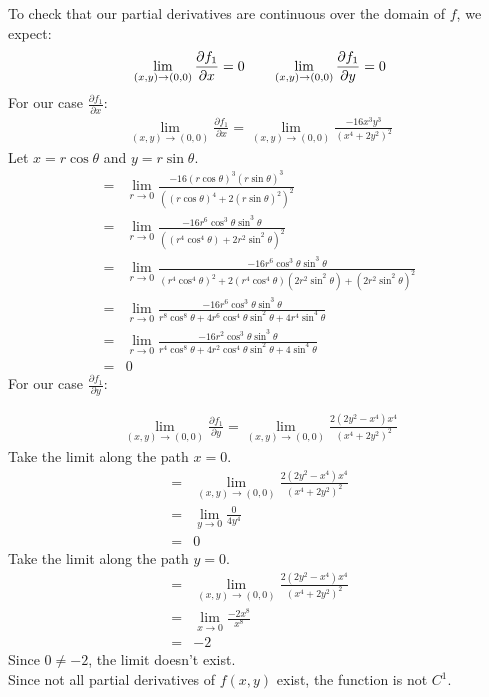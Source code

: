 \documentclass[12pt]{article}
\begin{document}
To check that our partial derivatives are continuous over the domain of $f$, we expect:
\[
	\lim_{(x,y) \rightarrow (0,0)}\frac{\partial f_1}{\partial x}=0 \hspace{20px} \lim_{(x,y) \rightarrow (0,0)}\frac{\partial f_1}{\partial y}=0
\]
\medskip
For our case $\frac{\partial f_1}{\partial x}$:
\begin{align}
	\lim_{(x,y) \rightarrow (0,0)}\frac{\partial f_1}{\partial x}=\lim_{(x,y) \rightarrow (0,0)}\frac{-16x^3y^3}{(x^4+2y^2)^2}
\end{align}
Let $x=r\cos \theta$ and $y=r\sin \theta$.
\begin{align*}
	=&\lim_{r \rightarrow 0}\frac{-16(r\cos \theta)^3(r\sin \theta)^3}{((r\cos \theta)^4+2(r\sin \theta)^2)^2}\\
	=&\lim_{r \rightarrow 0}\frac{-16r^6\cos^3 \theta \sin^3 \theta}{((r^4\cos^4 \theta)+2r^2\sin^2 \theta)^2} \\
	=&\lim_{r \rightarrow 0}\frac{-16r^6\cos^3 \theta \sin^3 \theta}{(r^4\cos^4 \theta)^2+2(r^4\cos^4 \theta)(2r^2\sin^2 \theta)+(2r^2\sin^2 \theta)^2} \\
	=&\lim_{r \rightarrow 0}\frac{-16r^6\cos^3 \theta \sin^3 \theta}{r^8\cos^8 \theta+4r^6\cos^4 \theta\sin^2 \theta+4r^4\sin^4 \theta} \\
	=&\lim_{r \rightarrow 0}\frac{-16r^2\cos^3 \theta \sin^3 \theta}{r^4\cos^8 \theta+4r^2\cos^4 \theta\sin^2 \theta+4\sin^4 \theta} \\
	=&0
\end{align*}
\medskip
For our case $\frac{\partial f_1}{\partial y}$:

\begin{align}
\lim_{(x,y) \rightarrow (0,0)}\frac{\partial f_1}{\partial y}=\lim_{(x,y) \rightarrow (0,0)}\frac{2(2y^2-x^4)x^4}{(x^4+2y^2)^2}
\end{align}
Take the limit along the path $x=0$.
\begin{align*}
=&\lim_{(x,y) \rightarrow (0,0)}\frac{2(2y^2-x^4)x^4}{(x^4+2y^2)^2}\\
=&\lim_{y \rightarrow 0}\frac{0}{4y^4}\\
=&0
\end{align*}
Take the limit along the path $y=0$.
\begin{align*}
=&\lim_{(x,y) \rightarrow (0,0)}\frac{2(2y^2-x^4)x^4}{(x^4+2y^2)^2}\\
=&\lim_{x \rightarrow 0}\frac{-2x^8}{x^8}\\
=&-2
\end{align*}
Since $0 \neq -2$, the limit doesn't exist.\\
\medskip
Since not all partial derivatives of $f(x,y)$ exist, the function is not $C^1$.
\end{document}
